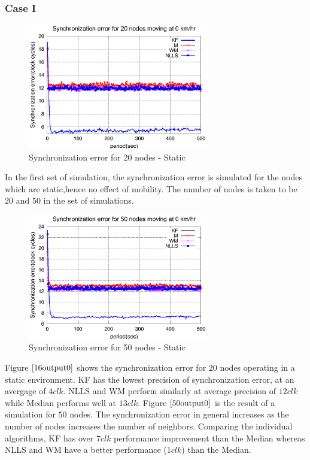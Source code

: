 \documentclass[a4paper,10pt]{report}
\begin{document}
\subsubsection{\textbf{Case I}}
\begin{figure}[!h]
\centering
\includegraphics[width=0.7\textwidth]{16output-s0}
\caption{Synchronization error for 20 nodes - Static} \label{16output0}
\end{figure}
In the first set of simulation, the synchronization error is simulated for the nodes which are static,hence no effect of mobility. The number of nodes is taken to be $20$ and $50$ in the set of simulations.  \newline
\begin{figure}
\centering
\includegraphics[width=0.7\textwidth]{50output-s0}
\caption{Synchronization error for 50 nodes - Static} \label{50output0}
\end{figure}
Figure $\ref{16output0}$ shows the synchronization error for $20$ nodes operating in a static environment. KF has the lowest precision of synchronization error, at an avergage of $4clk$. NLLS and WM perform similarly at average precision of $12clk$ while Median performs well at $13clk$. \newline 
Figure $\ref{50output0}$ is the result of a simulation for $50$ nodes. The synchronization error in general increases as the number of nodes increases the number of neighbors. Comparing the individual algorithms, KF has over $7clk$ performance improvement than the Median whereas NLLS and WM have a better performance ($1clk$) than the Median.
\end{document}
